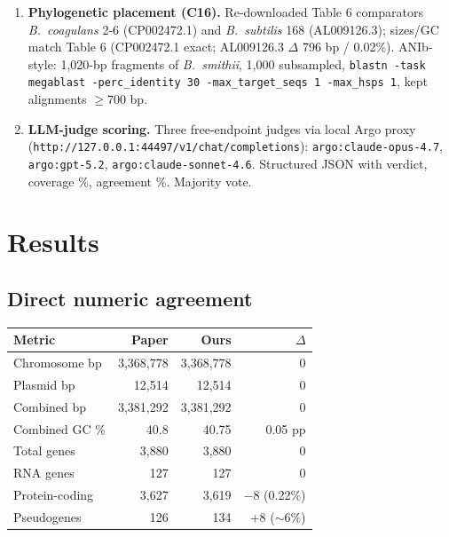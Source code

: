 \documentclass[11pt]{article}
\begin{document}
\begin{enumerate}
\item \textbf{Phylogenetic placement (C16).} Re-downloaded Table 6 comparators \textit{B.\ coagulans} 2-6 (CP002472.1) and \textit{B.\ subtilis} 168 (AL009126.3); sizes/GC match Table 6 (CP002472.1 exact; AL009126.3 $\Delta$ 796 bp / 0.02\%). ANIb-style: 1{,}020-bp fragments of \textit{B.\ smithii}, 1{,}000 subsampled, \texttt{blastn -task megablast -perc\_identity 30 -max\_target\_seqs 1 -max\_hsps 1}, kept alignments $\geq$700 bp.
\item \textbf{LLM-judge scoring.} Three free-endpoint judges via local Argo proxy (\texttt{http://127.0.0.1:44497/v1/chat/completions}): \texttt{argo:claude-opus-4.7}, \texttt{argo:gpt-5.2}, \texttt{argo:claude-sonnet-4.6}. Structured JSON with verdict, coverage \%, agreement \%. Majority vote.
\end{enumerate}

\section{Results}

\subsection{Direct numeric agreement}
\begin{center}
\begin{tabular}{lrrr}
\toprule
Metric & Paper & Ours & $\Delta$ \\
\midrule
Chromosome bp   & 3{,}368{,}778 & 3{,}368{,}778 & 0 \\
Plasmid bp      & 12{,}514      & 12{,}514      & 0 \\
Combined bp     & 3{,}381{,}292 & 3{,}381{,}292 & 0 \\
Combined GC \%  & 40.8          & 40.75         & 0.05 pp \\
Total genes     & 3{,}880       & 3{,}880       & 0 \\
RNA genes       & 127           & 127           & 0 \\
Protein-coding  & 3{,}627       & 3{,}619       & $-$8 (0.22\%) \\
Pseudogenes     & 126           & 134           & +8 ($\sim$6\%) \\
\bottomrule
\end{tabular}
\end{center}
\end{document}
